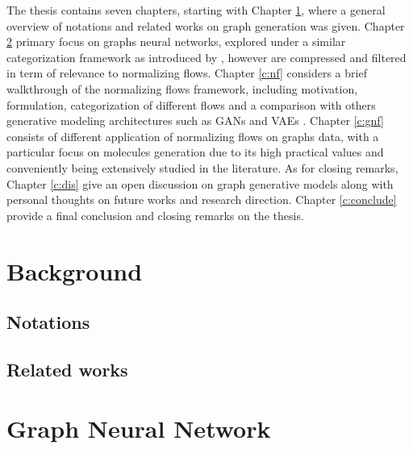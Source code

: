 The thesis contains seven chapters, starting with Chapter \ref{c:bg}, where a general overview of notations and related works on graph generation was given. Chapter \ref{c:gnn} primary focus on graphs neural networks, explored under a similar categorization framework as introduced by \cite{zhouGraphNeuralNetworks2020}, however are compressed and filtered in term of relevance to normalizing flows. Chapter \ref{c:nf} considers a brief walkthrough of the normalizing flows framework, including motivation, formulation, categorization of different flows and a comparison with others generative modeling architectures such as GANs \cite{goodfellowGenerativeAdversarialNetworks2014} and VAEs \cite{kingmaAutoEncodingVariationalBayes2014}. Chapter \ref{c:gnf} consists of different application of normalizing flows on graphs data, with a particular focus on molecules generation due to its high practical values and conveniently being extensively studied in the literature. As for closing remarks, Chapter \ref{c:dis} give an open discussion on graph generative models along with personal thoughts on future works and research direction. Chapter \ref{c:conclude} provide a final conclusion and closing remarks on the thesis.


\chapter{Background}
\label{c:bg}
\section{Notations}
\section{Related works}

\chapter{Graph Neural Network}
\label{c:gnn}

